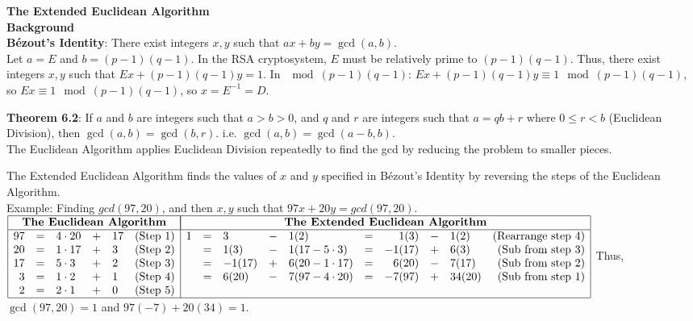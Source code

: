 \documentclass{article}
\begin{document}
\begin{flushleft}
    \LARGE\textbf{The Extended Euclidean Algorithm}\normalsize\\ \vspace{11pt} 
    \textbf{Background}\\
    \textbf{Bézout’s Identity}: There exist integers $x, y$ such that $ax + by = \gcd(a, b)$.\\
    Let $a = E$ and $b = (p-1)(q-1)$. In the RSA cryptosystem, $E$ must be relatively prime to $(p-1)(q-1)$. Thus, there exist integers $x, y$ such that $Ex + (p-1)(q-1)y = 1$. In $\mod{(p-1)(q-1)}$: $Ex + (p-1)(q-1)y \equiv 1 \mod{(p-1)(q-1)}$, so $Ex \equiv 1 \mod{(p-1)(q-1)}$, so $x = E^{-1} = D$.\\ \vspace{8pt}   
    
    \textbf{Theorem 6.2}: If $a$ and $b$ are integers such that $a > b > 0$, and $q$ and $r$ are integers such that $a = qb + r$ where $0 \leq r < b$ (Euclidean Division), then $\gcd(a, b) = \gcd(b, r)$. i.e. $\gcd(a, b) = \gcd(a-b, b)$.\\
    The Euclidean Algorithm applies Euclidean Division repeatedly to find the gcd by reducing the problem to smaller pieces.\\\vspace{8pt}   

    The Extended Euclidean Algorithm finds the values of $x$ and $y$ specified in Bézout’s Identity by reversing the steps of the Euclidean Algorithm.\\
    Example: Finding $gcd(97, 20)$, and then $x, y$ such that $97x + 20y = gcd(97, 20)$.
    $\begin{array}{|rclclr|rclclcrclr|}
        \hline
         \multicolumn{6}{|c|}{\textbf{The Euclidean Algorithm}}& \multicolumn{10}{|c|}{\textbf{The Extended Euclidean Algorithm}}\\ \hline
          97&=&4\cdot20&+&17&\text{(Step 1)}&1&=&3     &-&1(2)           &=&1(3)  &-&1(2)&\text{(Rearrange step 4)}\\  
          20&=&1\cdot17&+&3 &\text{(Step 2)}& &=&1(3)  &-&1(17-5\cdot3)&=&-1(17)&+&6(3)&\text{(Sub from step 3)}\\
          17&=&5\cdot3 &+&2 &\text{(Step 3)}& &=&-1(17)&+&6(20-1\cdot17)&=&6(20)&-&7(17)&\text{(Sub from step 2)}\\
          3 &=&1\cdot2 &+&1 &\text{(Step 4)}& &=&6(20)&-&7(97-4\cdot20)&=&-7(97)&+&34(20)&\text{(Sub from step 1)}\\
          2 &=&2\cdot1 &+&0 &\text{(Step 5)}&&&&&&&&&&\\
         \hline
    \end{array}$
    Thus, $\gcd(97, 20) = 1$ and $97(-7) + 20(34) = 1$.
\end{flushleft}
\end{document}
